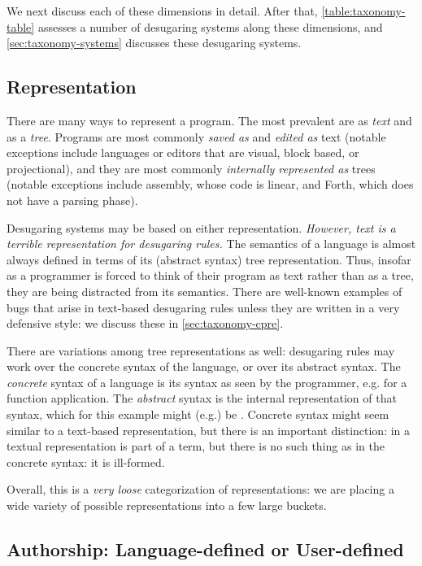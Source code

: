 We next discuss each of these dimensions in detail. After that,
\cref{table:taxonomy-table} assesses a number of desugaring systems
along these dimensions, and \cref{sec:taxonomy-systems} discusses
these desugaring systems.

\subsection{Representation}

There are many ways to represent a program. The most prevalent are as
\emph{text} and as a \emph{tree}. Programs are most commonly
\emph{saved as} and \emph{edited as} text (notable exceptions include
languages or editors that are visual, block based, or projectional),
and they are most commonly
\emph{internally represented as} trees (notable exceptions include
assembly, whose code is linear, and Forth, which does not have a
parsing phase).

Desugaring systems may be based on either representation.
\emph{However, text is a terrible representation for desugaring rules.}
The semantics of a language is almost always defined in terms of its
(abstract syntax) tree representation. Thus, insofar as a programmer
is forced to think of their program as text rather
than as a tree, they are being distracted from its semantics. There
are well-known examples of bugs that arise in text-based desugaring
rules unless they are written in a very defensive style: we discuss
these in \ref{sec:taxonomy-cpre}.

There are variations among tree representations as well: desugaring
rules may work over the concrete syntax of the language, or over its
abstract syntax. The \emph{concrete} syntax of a language is its
syntax as seen by the programmer, e.g.  for a function
application. The \emph{abstract} syntax is the internal representation
of that syntax, which for this example might (e.g.) be
. Concrete syntax might seem similar to a
text-based representation, but there is an important distinction:
 in a textual representation is part of a term, but
there is no such thing as  in the concrete syntax: it is
ill-formed.

Overall, this is a \emph{very loose} categorization of
representations: we are placing a wide variety of possible
representations into a few large buckets.


\subsection{Authorship: Language-defined or User-defined}

